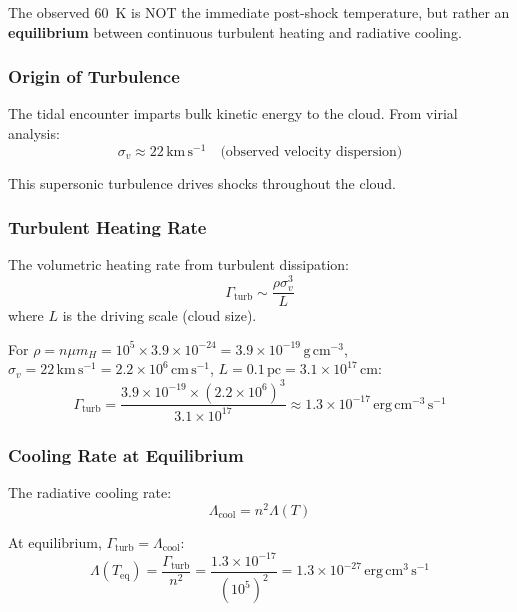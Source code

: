 \documentclass[11pt,a4paper]{article}
\newcommand{\kms}{\,\mathrm{km\,s^{-1}}}
\newcommand{\pc}{\,\mathrm{pc}}
\begin{document}
The observed 60~K is NOT the immediate post-shock temperature, but rather
an \textbf{equilibrium} between continuous turbulent heating and radiative cooling.

\subsubsection{Origin of Turbulence}
The tidal encounter imparts bulk kinetic energy to the cloud.
From virial analysis:
\begin{equation}
    \sigma_v \approx 22\kms \quad \text{(observed velocity dispersion)}
\end{equation}

This supersonic turbulence drives shocks throughout the cloud.

\subsubsection{Turbulent Heating Rate}
The volumetric heating rate from turbulent dissipation:
\begin{equation}
    \Gamma_\mathrm{turb} \sim \frac{\rho \sigma_v^3}{L}
\end{equation}
where $L$ is the driving scale (cloud size).

For $\rho = n \mu m_H = 10^5 \times 3.9 \times 10^{-24} = 3.9 \times 10^{-19}\,\mathrm{g\,cm^{-3}}$,
$\sigma_v = 22\kms = 2.2 \times 10^6\,\mathrm{cm\,s^{-1}}$,
$L = 0.1\pc = 3.1 \times 10^{17}\,\mathrm{cm}$:
\begin{equation}
    \Gamma_\mathrm{turb} = \frac{3.9 \times 10^{-19} \times (2.2 \times 10^6)^3}{3.1 \times 10^{17}}
    \approx 1.3 \times 10^{-17}\,\mathrm{erg\,cm^{-3}\,s^{-1}}
\end{equation}

\subsubsection{Cooling Rate at Equilibrium}
The radiative cooling rate:
\begin{equation}
    \Lambda_\mathrm{cool} = n^2 \Lambda(T)
\end{equation}

At equilibrium, $\Gamma_\mathrm{turb} = \Lambda_\mathrm{cool}$:
\begin{equation}
    \Lambda(T_\mathrm{eq}) = \frac{\Gamma_\mathrm{turb}}{n^2}
    = \frac{1.3 \times 10^{-17}}{(10^5)^2} = 1.3 \times 10^{-27}\,\mathrm{erg\,cm^3\,s^{-1}}
\end{equation}
\end{document}
